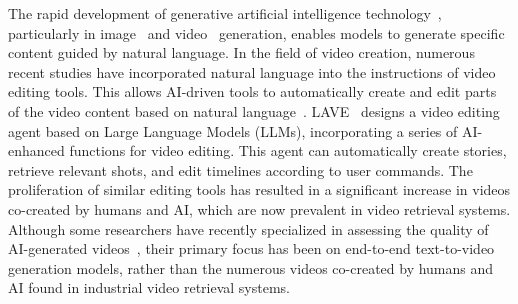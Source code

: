 The rapid development of generative artificial intelligence technology~\cite{achiam2023gpt, ho2020denoising, touvron2023llama}, particularly in image~\cite{ramesh2021zero} and video~\cite{videoworldsimulators2024} generation, enables models to generate specific content guided by natural language.
In the field of video creation, numerous recent studies have incorporated natural language into the instructions of video editing tools. This allows AI-driven tools to automatically create and edit parts of the video content based on natural language~\cite{fried2019text, huber2019b, huh2023avscript, pavel2020rescribe, laput2013pixeltone, chang2019design, lin2023identifying, wang2024lave}.
LAVE~\cite{wang2024lave} designs a video editing agent based on Large Language Models (LLMs), incorporating a series of AI-enhanced functions for video editing. This agent can automatically create stories, retrieve relevant shots, and edit timelines according to user commands.
The proliferation of similar editing tools has resulted in a significant increase in videos co-created by humans and AI, which are now prevalent in video retrieval systems.
Although some researchers have recently specialized in assessing the quality of AI-generated videos~\cite{carreira2017quo, unterthiner2019fvd, huang2024vbench, kou2024subjective, lu2024aigc}, their primary focus has been on end-to-end text-to-video generation models, rather than the numerous videos co-created by humans and AI found in industrial video retrieval systems.